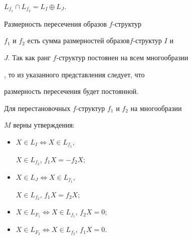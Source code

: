 \begin{thm}


$L_{f_1}\cap L_{f_2}=L_I\oplus L_J$.


\end{thm}





Размерность пересечения образов $f$-структур


$f_1$ и $f_2$ есть сумма размерностей образов\linebreak $f$-структур $I$ и


$J$. Так как ранг $f$-структур постоянен на всем многообразии


\cite{Stong}, то из указанного представления следует, что


размерность пересечения будет постоянной.





\begin{thm}


Для перестановочных $f$-структур $f_1$ и $f_2$ на многообразии


$M$ верны утверждения\/${:}$


\begin{itemize}


\item[1.] $X\in L_I\Leftrightarrow X\in L_{f_1}$,


$X\in L_{f_2}$, $f_1X=-f_2X;$


\item[2.] $X\in L_J\Leftrightarrow X\in L_{f_1}$,


$X\in L_{f_2}$, $f_1X=f_2X;$


\item[3.] $X\in L_{F_1}\Leftrightarrow X\in L_{f_1}$, $f_2X=0;$


\item[4.] $X\in L_{F_2}\Leftrightarrow X\in L_{f_2}$, $f_1X=0$.


\end{itemize}


\end{thm}





